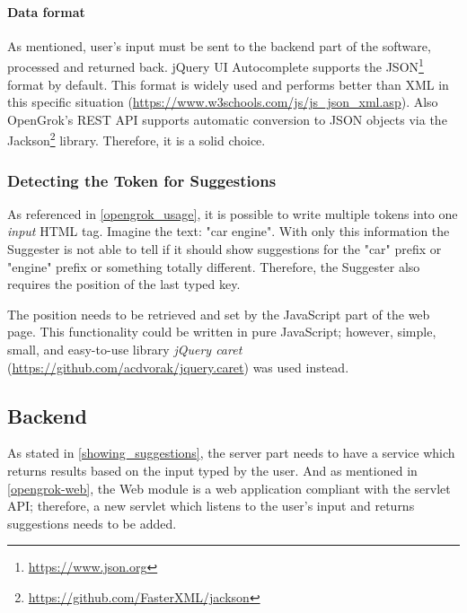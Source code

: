 \paragraph{Data format}
As mentioned, user's input must be sent to the backend part of the software, processed and
returned back. jQuery UI Autocomplete supports the JSON\footnote{\url{https://www.json.org}} format by default. This format
is widely used and performs better than XML in this
specific situation (\url{https://www.w3schools.com/js/js_json_xml.asp}). Also OpenGrok's REST API supports
automatic conversion to JSON objects via the Jackson\footnote{\url{https://github.com/FasterXML/jackson}} library.
Therefore, it is a solid choice.

\subsubsection{Detecting the Token for Suggestions}
As referenced in \ref{opengrok_usage}, it is possible to write multiple tokens into one \textit{input} HTML tag.
Imagine the text: "car engine". With only this information the Suggester is not able to tell if it should show
suggestions for the "car" prefix or "engine" prefix or something totally different. Therefore, the Suggester also requires the position of the last typed
key.

The position needs to be retrieved and set by the JavaScript part of the web page. This functionality could be written in
pure JavaScript; however, simple, small, and easy-to-use library \textit{jQuery caret} (\url{https://github.com/acdvorak/jquery.caret})
was used instead.

\subsection{Backend}
As stated in \ref{showing_suggestions}, the server part needs to have a service which returns results based on the
input typed by the user. And as mentioned in \ref{opengrok-web}, the Web module is a web application compliant with
the servlet API; therefore, a new servlet which listens to the user's input and returns suggestions needs to be added.


